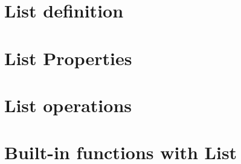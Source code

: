 \section{List definition}


\section{List Properties}


\section{List operations}


\section{Built-in functions with List}



